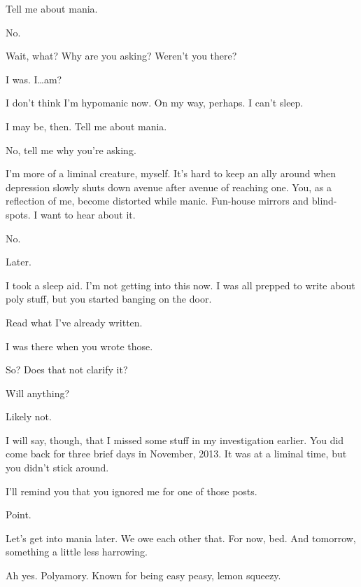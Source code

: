 \begin{ally}
Tell me about mania.
\end{ally}
No.

Wait, what? Why are you asking? Weren't you there?

\begin{ally}
I was. I\ldots{}am?
\end{ally}
I don't think I'm hypomanic now. On my way, perhaps. I can't sleep.

\begin{ally}
I may be, then. Tell me about mania.
\end{ally}
No, tell me why you're asking.

\begin{ally}
I'm more of a liminal creature, myself. It's hard to keep an ally around when depression slowly shuts down avenue after avenue of reaching one. You, as a reflection of me, become distorted while manic. Fun-house mirrors and blind-spots. I want to hear about it.
\end{ally}
No.

Later.

I took a sleep aid. I'm not getting into this now. I was all prepped to write about poly stuff, but you started banging on the door.

Read what I've already written. %

\begin{ally}
I was there when you wrote those.
\end{ally}
So? Does that not clarify it?

\begin{ally}
Will anything?
\end{ally}
Likely not.

I will say, though, that I missed some stuff in my investigation earlier. You did come back for three brief days in November, 2013. It was at a liminal time, but you didn't stick around.

\begin{ally}
I'll remind you that you ignored me for one of those posts.
\end{ally}
Point.

Let's get into mania later. We owe each other that. For now, bed. And tomorrow, something a little less harrowing.

\begin{ally}
Ah yes. Polyamory. Known for being easy peasy, lemon squeezy.
\end{ally}
